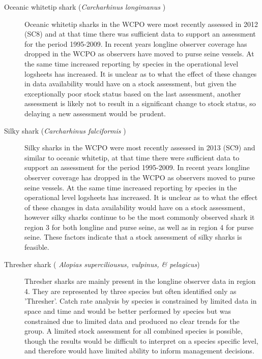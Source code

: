 \documentclass[12pt]{SCreport}
\begin{document}
\begin{description}
 
 \item[Oceanic whitetip shark (\emph{Carcharhinus longimanus} ) ] Oceanic whitetip sharks in the WCPO were most recently assessed in 2012 (SC8) and at that time there was sufficient data to support an assessment for the period 1995-2009. In recent years longline observer coverage has dropped in the WCPO as observers have moved to purse seine vessels. At the same time increased reporting by species in the operational level logsheets has increased. It is unclear as to what the effect of these changes in data availability would have on a stock assessment, but given the exceptionally poor stock status based on the last assessment, another assessment is likely not to result in a significant change to stock status, so delaying a new assessment would be prudent.

\item[Silky  shark (\emph{Carcharhinus falciformis} ) ] Silky sharks in the WCPO were most recently assessed in 2013 (SC9) and similar to oceanic whitetip, at that time there were sufficient data to support an assessment for the period 1995-2009. In recent years longline observer coverage has dropped in the WCPO as observers moved to purse seine vessels. At the same time increased reporting by species in the operational level logsheets has increased. It is unclear as to what the effect of these changes in data availability would have on a stock assessment, however silky sharks continue to be the most commonly observed shark it region 3 for both longline and purse seine, as well as in region 4 for purse seine. These factors indicate that a stock assessment of silky sharks is feasible.

\item[ Thresher shark (\emph{ Alopias superciliousus, vulpinus, \& pelagicus}) ]  Thresher sharks are mainly present in the longline observer data in region 4. %
They are represented by three species but often identified only as 'Thresher'.   Catch rate analysis by species is constrained by limited data in space and time and would be better performed by species but was constrained due to limited data and produced no clear trends for the group. A limited stock assessment for all combined species is possible, though the results would be difficult to interpret on a species specific level, and therefore would have limited ability to inform management decisions.


\end{description}
\end{document}
